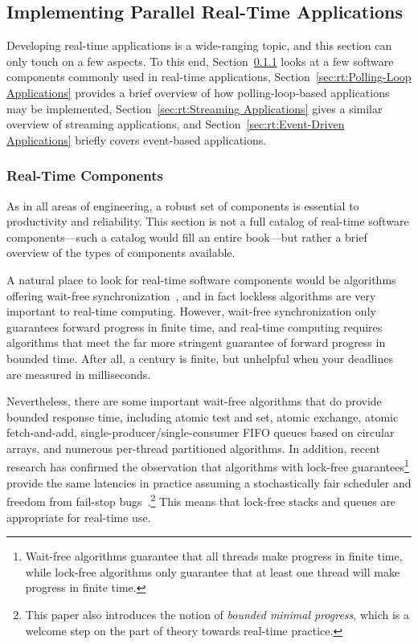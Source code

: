 \subsection{Implementing Parallel Real-Time Applications}
\label{sec:rt:Implementing Parallel Real-Time Applications}

Developing real-time applications is a wide-ranging topic, and this
section can only touch on a few aspects.
To this end,
Section~\ref{sec:rt:Real-Time Components}
looks at a few software components commonly used in real-time applications,
Section~\ref{sec:rt:Polling-Loop Applications}
provides a brief overview of how polling-loop-based applications may
be implemented,
Section~\ref{sec:rt:Streaming Applications}
gives a similar overview of streaming applications, and
Section~\ref{sec:rt:Event-Driven Applications}
briefly covers event-based applications.

\subsubsection{Real-Time Components}
\label{sec:rt:Real-Time Components}

As in all areas of engineering, a robust set of components is essential
to productivity and reliability.
This section is not a full catalog of real-time software components---such
a catalog would fill an entire book---but rather a brief overview of the
types of components available.

A natural place to look for real-time software components would be
algorithms offering wait-free
synchronization~\cite{Herlihy91}, and in fact lockless
algorithms are very important to real-time computing.
However, wait-free synchronization only guarantees forward progress in
finite time, and real-time computing requires algorithms that meet the
far more stringent guarantee of forward progress in bounded time.
After all, a century is finite, but unhelpful when your deadlines are
measured in milliseconds.

Nevertheless, there are some important wait-free algorithms that do
provide bounded response time, including atomic test and set,
atomic exchange,
atomic fetch-and-add,
single-producer/single-consumer FIFO queues based on circular arrays,
and numerous per-thread partitioned algorithms.
In addition, recent research has confirmed the observation that
algorithms with lock-free guarantees\footnote{
	Wait-free algorithms guarantee that all threads make progress in
	finite time, while lock-free algorithms only guarantee that at
	least one thread will make progress in finite time.}
provide the same latencies in practice assuming a stochastically
fair scheduler and freedom from fail-stop
bugs~\cite{DanAlitarh2013PracticalProgress}.\footnote{
	This paper also introduces the notion of \emph{bounded minimal
	progress}, which is a welcome step on the part of theory
	towards real-time practice.}
This means that lock-free stacks and queues are appropriate
for real-time use.

